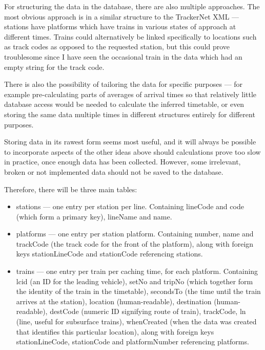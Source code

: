 \documentclass[a4paper,12pt]{article}
\begin{document}
For structuring the data in the database, there are also multiple approaches.
The most obvious approach is in a similar structure to the TrackerNet XML ---
stations have platforms which have trains in various states of approach at
different times. Trains could alternatively be linked specifically to locations
such as track codes as opposed to the requested station, but this could prove
troublesome since I have seen the occasional train in the data which had an
empty string for the track code.

There is also the possibility of tailoring the data for specific purposes ---
for example pre-calculating parts of averages of arrival times so that
relatively little database access would be needed to calculate the inferred
timetable, or even storing the same data multiple times in different structures
entirely for different purposes.

Storing data in its rawest form seems most useful, and it will
always be possible to incorporate aspects of the other ideas above should
calculations prove too slow in practice, once enough data has been collected.
However, some irrelevant, broken or not implemented data should not be saved to
the database.

Therefore, there will be three main tables:
\begin{itemize}
  \item stations --- one entry per station per line. Containing lineCode and
    code (which form a primary key), lineName and name.
  \item platforms --- one entry per station platform. Containing number, name
    and trackCode (the track code for the front of the platform), along with
    foreign keys stationLineCode and stationCode referencing stations.
  \item trains --- one entry per train per caching time, for each platform.
    Containing lcid (an ID for the leading vehicle), setNo and tripNo (which
    together form the identity of the train in the timetable), secondsTo (the
    time until the train arrives at the station), location (human-readable),
    destination (human-readable), destCode (numeric ID signifying route of
    train), trackCode, ln (line, useful for subsurface trains), whenCreated
    (when the data was created that identifies this particular location), along
    with foreign keys stationLineCode, stationCode and platformNumber
    referencing platforms.
\end{itemize}
\end{document}
